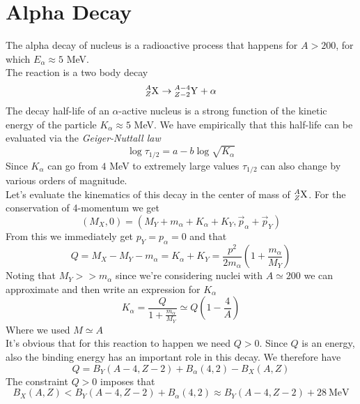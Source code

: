 \documentclass[../qm.tex]{subfiles}
\begin{document}
\section{Alpha Decay}
The alpha decay of nucleus is a radioactive process that happens for $A>200$, for which $E_\alpha\approx5$ MeV.\\
The reaction is a two body decay
\begin{equation*}
	\nuc{X}{A}{Z}\to\nuc{Y}{A-4}{Z-2}+\alpha
\end{equation*}
The decay half-life of an $\alpha$-active nucleus is a strong function of the kinetic energy of the particle $K_\alpha\approx5$ MeV. We have empirically that this half-life can be evaluated via the \emph{Geiger-Nuttall law}
\begin{equation}
	\log\tau_{1/2}=a-b\log\sqrt{K_\alpha}
	\label{eq:geigernuttal}
\end{equation}
Since $K_\alpha$ can go from $4$ MeV to extremely large values $\tau_{1/2}$ can also change by various orders of magnitude.\\
Let's evaluate the kinematics of this decay in the center of mass of $\nuc{X}{A}{Z}$. For the conservation of 4-momentum we get
\begin{equation*}
	\left( M_X,0 \right)=\left( M_Y+m_\alpha+K_\alpha+K_Y,\vec{p}_\alpha+\vec{p}_Y \right)
\end{equation*}
From this we immediately get $p_Y=p_\alpha=0$ and that
\begin{equation*}
	Q=M_X-M_Y-m_\alpha=K_\alpha+K_Y=\frac{p^2}{2m_\alpha}\left( 1+\frac{m_\alpha}{M_Y} \right)
\end{equation*}
Noting that $M_Y>>m_\alpha$ since we're considering nuclei with $A\simeq200$ we can approximate and then write an expression for $K_\alpha$
\begin{equation}
	K_\alpha=\frac{Q}{1+\frac{m_\alpha}{M_Y}}\simeq Q\left( 1-\frac{4}{A} \right)
	\label{eq:Kalphadecay}
\end{equation}
Where we used $M\simeq A$\\
It's obvious that for this reaction to happen we need $Q>0$. Since $Q$ is an energy, also the binding energy has an important role in this decay. We therefore have
\begin{equation}
	Q=B_Y(A-4,Z-2)+B_\alpha(4,2)-B_X(A,Z)
	\label{eq:qbinden}
\end{equation}
The constraint $Q>0$ imposes that
\begin{equation*}
	B_X(A,Z)<B_Y(A-4,Z-2)+B_\alpha(4,2)\approx B_Y(A-4,Z-2)+28\ \mathrm{MeV}
\end{equation*}
\end{document}
